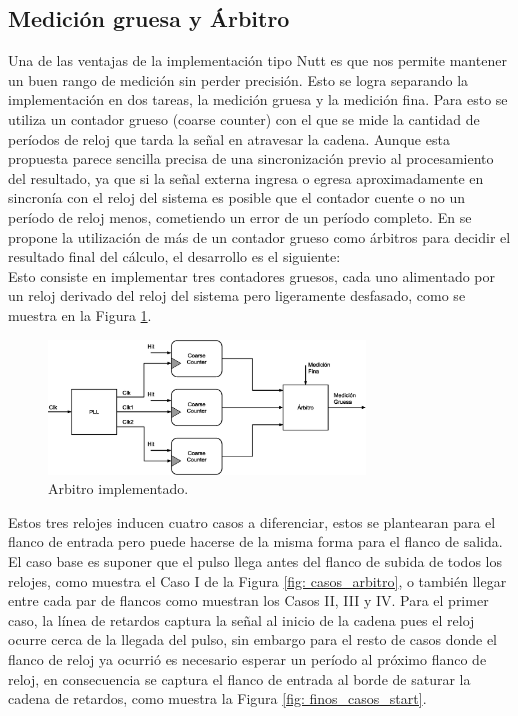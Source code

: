 \subsection{Medición gruesa y Árbitro}
Una de las ventajas de la implementación tipo Nutt es que nos permite mantener un buen rango de medición sin perder precisión. Esto se logra separando la implementación en dos tareas, 
la medición gruesa y la medición fina. Para esto se utiliza un contador grueso (coarse counter) con el que se mide la cantidad de períodos de reloj que tarda la señal en atravesar la cadena.
Aunque esta propuesta parece sencilla precisa de una sincronización previo al procesamiento del resultado, ya que si la señal externa ingresa o egresa aproximadamente
en sincronía con el reloj del sistema es posible que el contador cuente o no un período de reloj menos, cometiendo un error de un período completo.
En \cite{machado_novel_2018} se propone la utilización de más de un contador grueso como árbitros
para decidir el resultado final del cálculo, el desarrollo es el siguiente:\\

Esto consiste en implementar tres contadores gruesos, cada uno alimentado por un reloj derivado del reloj del sistema pero ligeramente desfasado, como se muestra
en la Figura \ref{fig: arbitro}.
\begin{figure}[H]
     \centering
     \includegraphics[width=0.75\textwidth]{imagenes/arbiter.eps}
     \caption{Arbitro implementado.}
     \label{fig: arbitro}
\end{figure}

Estos tres relojes inducen cuatro casos a diferenciar, estos se plantearan
para el flanco de entrada pero
puede hacerse de la misma forma para el flanco de salida.\\
El caso base es suponer que el pulso llega antes del flanco de subida de todos los relojes,
como muestra el Caso I de la Figura \ref{fig: casos_arbitro}, o también llegar entre cada par de flancos como muestran los Casos II, III y IV.
Para el primer caso, la línea de retardos captura la señal al inicio de la cadena pues el reloj ocurre cerca de la llegada del pulso, sin embargo
para el resto de casos donde el flanco de reloj ya ocurrió es necesario esperar un período al próximo flanco de reloj, en consecuencia se captura el flanco de entrada
al borde de saturar la cadena de retardos, como muestra la Figura \ref{fig: finos_casos_start}.\\

